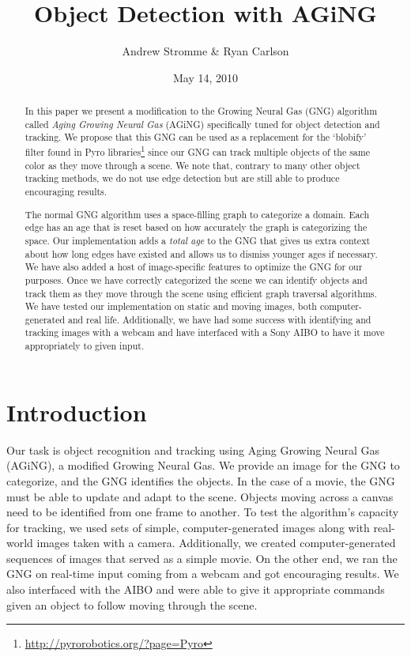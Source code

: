 \documentclass{article}
\renewcommand{\|}{\origbar} %
\begin{document}
\title{Object Detection with AGiNG}
\author{Andrew Stromme \& Ryan Carlson}
\date{May 14, 2010}
\maketitle

\begin{abstract}
  In this paper we present a modification to the Growing Neural Gas (GNG) algorithm called {\em Aging Growing Neural Gas} (AGiNG) specifically tuned for object detection and tracking. We propose that this GNG can be used as a replacement for the `blobify' filter found in Pyro libraries\footnote{\url{http://pyrorobotics.org/?page=Pyro}} since our GNG can track multiple objects of the same color as they move through a scene. We note that, contrary to many other object tracking methods, we do not use edge detection but are still able to produce encouraging results.
  
  The normal GNG algorithm uses a space-filling graph to categorize a domain. Each edge has an age that is reset based on how accurately the graph is categorizing the space. Our implementation adds a {\em total age} to the GNG that gives us extra context about how long edges have existed and allows us to dismiss younger ages if necessary. We have also added a host of image-specific features to optimize the GNG for our purposes. Once we have correctly categorized the scene we can identify objects and track them as they move through the scene using efficient graph traversal algorithms. We have tested our implementation on static and moving images, both computer-generated and real life. Additionally, we have had some success with identifying and tracking images with a webcam and have interfaced with a Sony AIBO to have it move appropriately to given input.
\end{abstract}

\section{Introduction}

Our task is object recognition and tracking using Aging Growing Neural Gas (AGiNG), a modified Growing Neural Gas. We provide an image for the GNG to categorize, and the GNG identifies the objects. In the case of a movie, the GNG must be able to update and adapt to the scene. Objects moving across a canvas need to be identified from one frame to another. To test the algorithm's capacity for tracking, we used sets of simple, computer-generated images along with real-world images taken with a camera. Additionally, we created computer-generated sequences of images that served as a simple movie. On the other end, we ran the GNG on real-time input coming from a webcam and got encouraging results. We also interfaced with the AIBO and were able to give it appropriate commands given an object to follow moving through the scene.
\end{document}
